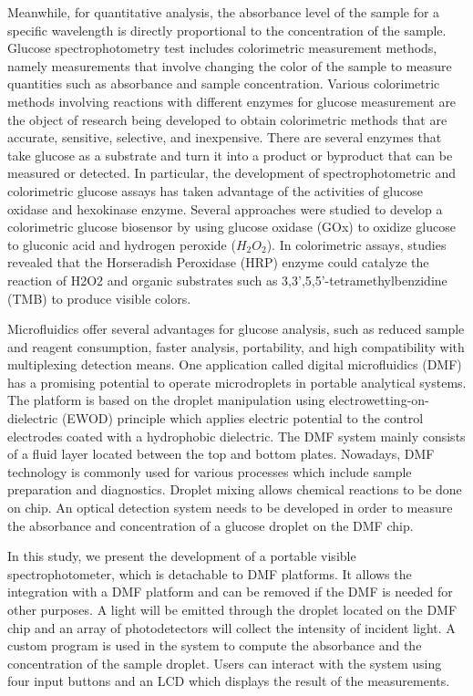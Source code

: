 \documentclass[conference]{IEEEtran}
\begin{document}
Meanwhile, for quantitative analysis, the absorbance level of the sample for a specific wavelength is directly proportional to the concentration of the sample.
Glucose spectrophotometry test includes colorimetric measurement methods, namely measurements that involve changing the color of the sample to measure quantities such as absorbance and sample concentration.
Various colorimetric methods involving reactions with different enzymes for glucose measurement are the object of research being developed to obtain colorimetric methods that are accurate, sensitive, selective, and inexpensive.
There are several enzymes that take glucose as a substrate and turn it into a product or byproduct that can be measured or detected.
In particular, the development of spectrophotometric and colorimetric glucose assays has taken advantage of the activities of glucose oxidase and hexokinase enzyme\cite{b1}.
Several approaches were studied to develop a colorimetric glucose biosensor by using glucose oxidase (GOx) to oxidize glucose to gluconic acid and hydrogen peroxide ($H_2O_2$).
In colorimetric assays, studies revealed that the Horseradish Peroxidase (HRP) enzyme could catalyze the reaction of H2O2 and organic substrates such as 3,3',5,5'-tetramethylbenzidine (TMB) to produce visible colors\cite{b2}. 

Microfluidics offer several advantages for glucose analysis, such as reduced sample and reagent consumption, faster analysis, portability, and high compatibility with multiplexing detection means\cite{b3,b4}.
One application called digital microfluidics (DMF) has a promising potential to operate microdroplets in portable analytical systems.
The platform is based on the droplet manipulation using electrowetting-on-dielectric (EWOD) principle which applies electric potential to the control electrodes coated with a hydrophobic dielectric\cite{b3}.
The DMF system mainly consists of a fluid layer located between the top and bottom plates. Nowadays, DMF technology is commonly used for various processes which include sample preparation and diagnostics\cite{b5}.
Droplet mixing allows chemical reactions to be done on chip. An optical detection system needs to be developed in order to measure the absorbance and concentration of a glucose droplet on the DMF chip. 

In this study, we present the development of a portable visible spectrophotometer, which is detachable to DMF platforms.
It allows the integration with a DMF platform and can be removed if the DMF is needed for other purposes.
A light will be emitted through the droplet located on the DMF chip and an array of photodetectors will collect the intensity of incident light.
A custom program is used in the system to compute the absorbance and the concentration of the sample droplet.
Users can interact with the system using four input buttons and an LCD which displays the result of the measurements. 
\end{document}
